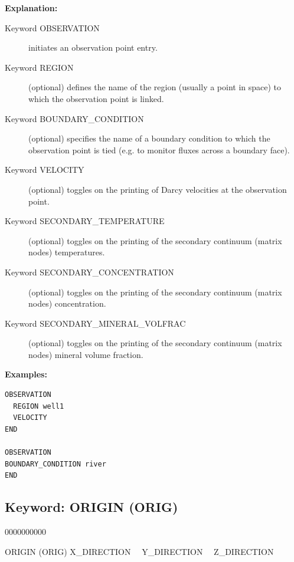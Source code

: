 {\noindent\bf Explanation:}
\begin{description}
\item[Keyword OBSERVATION] initiates an observation point entry.
\item[Keyword REGION] (optional) defines the name of the region (usually a point in space) to which the observation point is linked.
\item[Keyword BOUNDARY\_CONDITION] (optional) specifies the name of a boundary condition to which the observation point is tied (e.g. to monitor fluxes across a boundary face).
\item[Keyword VELOCITY] (optional) toggles on the printing of Darcy velocities at the observation point.
\item[Keyword SECONDARY\_TEMPERATURE] (optional) toggles on the printing of the secondary continuum (matrix nodes) temperatures.
\item[Keyword SECONDARY\_CONCENTRATION] (optional) toggles on the printing of the secondary continuum (matrix nodes) concentration.
\item[Keyword SECONDARY\_MINERAL\_VOLFRAC] (optional) toggles on the printing of the secondary continuum (matrix nodes) mineral volume fraction.
\end{description}

\begin{mdframed}

{\noindent\bf Examples:}
\footnotesize
\begin{verbatim}
OBSERVATION
  REGION well1
  VELOCITY
END

OBSERVATION
BOUNDARY_CONDITION river
END
\end{verbatim}
\normalsize
\end{mdframed}

\hyperlink{target_key}{\return}


\newpage
\protect\hypertarget{target_orig}{}

\subsection{Keyword: ORIGIN (ORIG)}

\hfill\hyperlink{target_key}{\return}

\begin{deflist}{0000000000}
\item[ORIGIN (ORIG)] X\_DIRECTION \ \ Y\_DIRECTION \ \ Z\_DIRECTION
\end{deflist}

